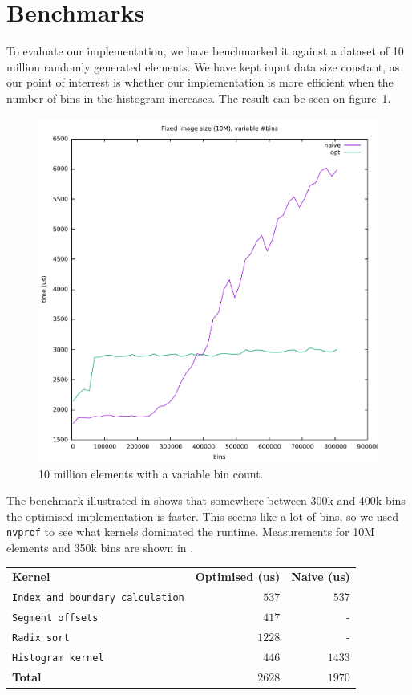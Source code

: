 \documentclass[12pt, a4paper, hidelinks]{article}
\def\fatline{\Xhline{2\arrayrulewidth}}
\renewcommand{\tt}[1]{\texttt{#1}}
\renewcommand{\bf}[1]{\textbf{#1}}
\begin{document}
\section{Benchmarks}
\label{section:bench}
To evaluate our implementation, we have benchmarked it against
a dataset of 10 million randomly generated elements.
We have kept input data size constant,
as our point of interrest is whether our implementation is more
efficient when the number of bins in the histogram increases.
The result can be seen on figure~\ref{fig:graph1}.

\begin{figure}[htpb]
    \centering
    \includegraphics[width=0.6\linewidth]{img/graphs/10M-varbins.pdf}
    \caption{10 million elements with a variable bin count.}
    \label{fig:graph1}
\end{figure}

The benchmark illustrated in 
shows that somewhere between 300k and 400k bins
the optimised implementation is faster.
This seems like a lot of bins,
so we used \tt{nvprof} to see what kernels dominated the runtime.
Measurements for 10M elements and 350k bins are shown in .

\begin{center}
  \begin{tabular}{l|r|r}
    \bf{Kernel} & \bf{Optimised (us)} & \bf{Naive (us)}   \\ \fatline
    \tt{Index and boundary calculation} & $537$  & $537$  \\ \hline
    \tt{Segment offsets}                & $417$  & -      \\ \hline
    \tt{Radix sort}                     & $1228$ & -      \\ \hline
    \tt{Histogram kernel}               & $446$  & $1433$ \\ \fatline
    \bf{Total}                          & $2628$ & $1970$ \\
  \end{tabular}\\
  \label{table:nvprof0}
\end{center}
\end{document}
